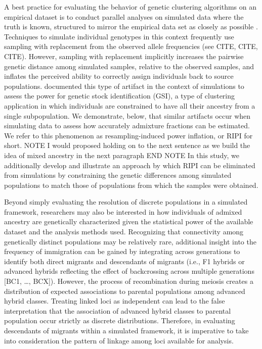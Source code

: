 A best practice for evaluating the behavior of genetic clustering algorithms on an empirical dataset is to conduct
parallel analyses on simulated data where the truth is known, structured to mirror the empirical data set
as closely as possible \citep{vaha2006efficiency,anderson2008improved,latch2011fine}.
Techniques to simulate individual genotypes in this context frequently use sampling with replacement from the
observed allele frequencies (see CITE, CITE, CITE).
However, sampling with replacement implicitly increases the pairwise genetic distance among simulated samples, relative to the observed 
samples, and
inflates the perceived ability to correctly assign individuals back to source populations. \citet{anderson2008improved}
documented this type of artifact in the context of simulations to assess the power for
genetic stock identification (GSI), a type of clustering application in which individuals are constrained to have
all their ancestry from a single subpopulation.
We demonstrate, below, that similar artifacts occur when simulating data to
assess how accurately admixture fractions can be estimated.  We refer to this phenomenon as resampling-induced
power inflation, or RIPI for short.
NOTE I would proposed holding on to the next sentence as we build the idea of mixed ancestry in the next paragraph END NOTE
In this study, we additionally develop and illustrate an approach by which RIPI can be eliminated
from simulations by constraining the genetic differences among simulated populations to match
those of populations from which the samples were obtained.

Beyond simply evaluating the resolution of discrete populations in a simulated framework, researchers may also be
interested in how individuals of admixed ancestry are genetically characterized given the statistical power of the available dataset and the 
analysis methods used.
Recognizing that connectivity among genetically distinct populations may be relatively rare, additional insight into the
frequency of immigration can be gained by integrating across generations to identify both direct migrants and descendants of migrants
 (i.e., F1 hybrids or advanced hybrids reflecting the effect of backcrossing across multiple generations [BC1, \ldots,
BCX]).
However, the process of recombination during meiosis creates a distribution of expected associations to parental populations among
advanced hybrid classes.
Treating linked loci as independent can lead to the false interpretation that the association of advanced hybrid classes to parental population 
occur strictly as discrete distributions.
Therefore, in evaluating descendants of migrants within a simulated framework, it is imperative to take into consideration the pattern of
linkage among loci available for analysis.

